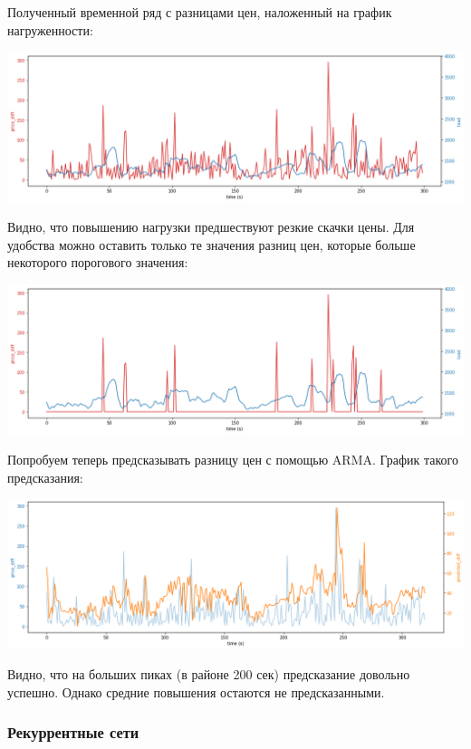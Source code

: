 Полученный временной ряд с разницами цен, наложенный на график нагруженности:

\begin{center}
    \includegraphics[width=450pt]{images/graph_diff_load.png}
\end{center}

Видно, что повышению нагрузки предшествуют резкие скачки цены. Для удобства можно оставить только те значения разниц цен, которые больше некоторого порогового значения:


\begin{center}
    \includegraphics[width=450pt]{images/graph_diff_load_2.png}
\end{center}

Попробуем теперь предсказывать разницу цен с помощью ARMA. График такого предсказания:


\begin{center}
    \includegraphics[width=450pt]{images/graph_arma_prediction.png}
\end{center}

Видно, что на больших пиках (в районе 200 сек) предсказание довольно успешно. Однако средние повышения остаются не предсказанными.
\newpage
\subsubsection{Рекуррентные сети}

